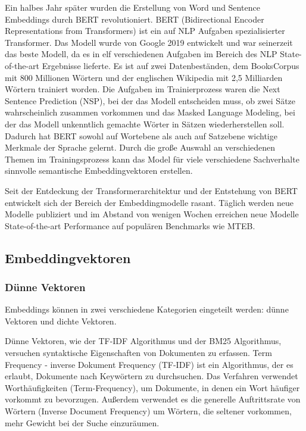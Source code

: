 Ein halbes Jahr später wurden die Erstellung von Word und Sentence Embeddings durch BERT revolutioniert.
BERT (Bidirectional Encoder Representations from Transformers) \cite{devlin2019} ist ein auf NLP Aufgaben spezialisierter Transformer.
Das Modell wurde von Google 2019 entwickelt und war seinerzeit das beste Modell, da es in elf verschiedenen Aufgaben im Bereich des NLP State-of-the-art Ergebnisse lieferte.
Es ist auf zwei Datenbeständen, dem BooksCorpus mit 800 Millionen Wörtern und der englischen Wikipedia mit 2,5 Milliarden Wörtern trainiert worden. 
Die Aufgaben im Trainierprozess waren die Next Sentence Prediction (NSP), bei der das Modell entscheiden muss, ob zwei Sätze wahrscheinlich zusammen vorkommen und das Masked Language Modeling, bei der das Modell unkenntlich gemachte Wörter in Sätzen wiederherstellen soll.
Dadurch hat BERT sowohl auf Wortebene als auch auf Satzebene wichtige Merkmale der Sprache gelernt.
Durch die große Auswahl an verschiedenen Themen im Trainingsprozess kann das Model für viele verschiedene Sachverhalte sinnvolle semantische Embeddingvektoren erstellen.
\cite{devlin2019}


Seit der Entdeckung der Transformerarchitektur und der Entstehung von BERT entwickelt sich der Bereich der Embeddingmodelle rasant.
Täglich werden neue Modelle publiziert und im Abstand von wenigen Wochen erreichen neue Modelle State-of-the-art Performance auf populären Benchmarks wie MTEB.  


\subsection{Embeddingvektoren}

\subsubsection{Dünne Vektoren}

Embeddings können in zwei verschiedene Kategorien eingeteilt werden: dünne Vektoren und dichte Vektoren.

Dünne Vektoren, wie der TF-IDF Algorithmus und der BM25 Algorithmus, versuchen syntaktische Eigenschaften von Dokumenten zu erfassen.
Term Frequency - inverse Dokument Frequency (TF-IDF) ist ein Algorithmus, der es erlaubt, Dokumente nach Keywörtern zu durchsuchen.
Das Verfahren verwendet Worthäufigkeiten (Term-Frequency), um Dokumente, in denen ein Wort häufiger vorkommt zu bevorzugen.
Außerdem verwendet es die generelle Auftrittsrate von Wörtern (Inverse Document Frequency) um Wörtern, die seltener vorkommen, mehr Gewicht bei der Suche einzuräumen.

